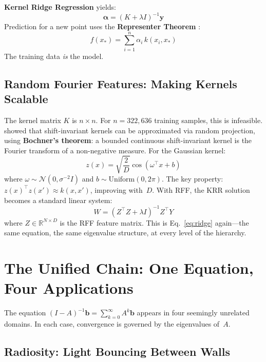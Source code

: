 \documentclass[11pt,a4paper]{article}
\begin{document}
\textbf{Kernel Ridge Regression} yields:
\begin{equation}\label{eq:krr}
  \boldsymbol{\alpha} = (K + \lambda I)^{-1} \mathbf{y}
\end{equation}
Prediction for a new point uses the \textbf{Representer Theorem} \citep{kimeldorf1970splines}:
\begin{equation}\label{eq:representer}
  f(x_*) = \sum_{i=1}^{n} \alpha_i\, k(x_i, x_*)
\end{equation}
The training data \emph{is} the model.

\subsection{Random Fourier Features: Making Kernels Scalable}

The kernel matrix $K$ is $n \times n$. For $n = 322{,}636$ training samples, this is infeasible. \citet{rahimi2007rff} showed that shift-invariant kernels can be approximated via random projection, using \textbf{Bochner's theorem}: a bounded continuous shift-invariant kernel is the Fourier transform of a non-negative measure. For the Gaussian kernel:
\begin{equation}\label{eq:rff}
  z(x) = \sqrt{\frac{2}{D}} \cos(\omega^\top x + b)
\end{equation}
where $\omega \sim \mathcal{N}(0, \sigma^{-2} I)$ and $b \sim \mathrm{Uniform}(0, 2\pi)$. The key property: $z(x)^\top z(x') \approx k(x, x')$, improving with~$D$. With RFF, the KRR solution becomes a standard linear system:
\begin{equation}\label{eq:rff_krr}
  W = (Z^\top Z + \lambda I)^{-1} Z^\top Y
\end{equation}
where $Z \in \mathbb{R}^{N \times D}$ is the RFF feature matrix. This is Eq.~\eqref{eq:ridge} again---the same equation, the same eigenvalue structure, at every level of the hierarchy.


\section{The Unified Chain: One Equation, Four Applications}\label{sec:chain}

The equation $(I - A)^{-1}\mathbf{b} = \sum_{k=0}^{\infty} A^k \mathbf{b}$ appears in four seemingly unrelated domains. In each case, convergence is governed by the eigenvalues of~$A$.

\subsection{Radiosity: Light Bouncing Between Walls}
\end{document}
